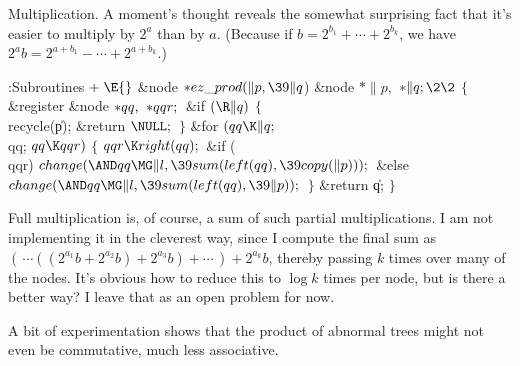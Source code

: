 Multiplication. A moment's thought reveals the somewhat
surprising fact that
it's easier to multiply by $2^a$ than by $a$. (Because if $b=2^{b_1}+\cdots
+2^{b_k}$, we have $2^ab=2^{a+b_1}-\cdots+2^{a+b_k}$.)

\Y\B\4:Subroutines\X${}\mathrel+\E{}$\6
\&{node} ${}{*}\\{ez\_prod}(\|p,\39\|q{}$)\1\1\6
\&{node} ${}{*}\|p,{}$ ${}{*}\|q;\2\2{}$\6
${}\{{}$\1\6
\&{register} \&{node} ${}{*}\\{qq},{}$ ${}{*}\\{qqr};{}$\7
\&{if} ${}(\R\|q){}$\5
${}\{{}$\1\6
\\{recycle}(\|p);\6
\&{return} ${}\NULL;{}$\6
\4${}\}{}$\2\6
\&{for} ${}(\\{qq}\K\|q;{}$ \\{qq}; ${}\\{qq}\K\\{qqr}){}$\5
${}\{{}$\1\6
${}\\{qqr}\K\\{right}(\\{qq});{}$\6
\&{if} (\\{qqr})\1\5
${}\\{change}({\AND}\\{qq}\MG\|l,\39\\{sum}(\\{left}(\\{qq}),\39\\{copy}(%
\|p)));{}$\2\6
\&{else}\1\5
${}\\{change}({\AND}\\{qq}\MG\|l,\39\\{sum}(\\{left}(\\{qq}),\39\|p));{}$\2\6
\4${}\}{}$\2\6
\&{return} \|q;\6
\4${}\}{}$\2\par
\fi

Full multiplication is, of course, a sum of such partial
multiplications.
I am not implementing it in the cleverest way, since I compute the
final sum as $(\,\cdots((2^{a_1}b +2^{a_2}b)+2^{a_3}b)+\cdots\,)+2^{a_k}b$,
thereby passing $k$ times over many of the nodes. It's obvious how to
reduce this to $\log k$ times per node, but is there a better way?
I leave that as an open problem for now.

A bit of experimentation shows that the product of abnormal trees
might not even be commutative, much less associative.


